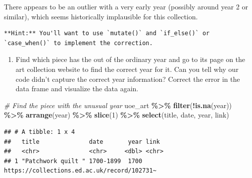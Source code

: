 \documentclass[
]{article}
\newenvironment{Shaded}{\begin{snugshade}}{\end{snugshade}}
\newcommand{\CommentTok}[1]{\textcolor[rgb]{0.56,0.35,0.01}{\textit{#1}}}
\newcommand{\DecValTok}[1]{\textcolor[rgb]{0.00,0.00,0.81}{#1}}
\newcommand{\FunctionTok}[1]{\textcolor[rgb]{0.13,0.29,0.53}{\textbf{#1}}}
\newcommand{\NormalTok}[1]{#1}
\newcommand{\SpecialCharTok}[1]{\textcolor[rgb]{0.81,0.36,0.00}{\textbf{#1}}}
\providecommand{\tightlist}{%
  \setlength{\itemsep}{0pt}\setlength{\parskip}{0pt}}
\begin{document}
There appears to be an outlier with a very early year (possibly around
year 2 or similar), which seems historically implausible for this
collection.

\begin{verbatim}
**Hint:** You'll want to use `mutate()` and `if_else()` or `case_when()` to implement the correction.
\end{verbatim}

\begin{enumerate}
\def\labelenumi{\arabic{enumi}.}
\setcounter{enumi}{11}
\tightlist
\item
  Find which piece has the out of the ordinary year and go to its page
  on the art collection website to find the correct year for it. Can you
  tell why our code didn't capture the correct year information? Correct
  the error in the data frame and visualize the data again.
\end{enumerate}

\begin{Shaded}
\begin{Highlighting}[]
\CommentTok{\# Find the piece with the unusual year}
\NormalTok{uoe\_art }\SpecialCharTok{\%\textgreater{}\%}
  \FunctionTok{filter}\NormalTok{(}\SpecialCharTok{!}\FunctionTok{is.na}\NormalTok{(year)) }\SpecialCharTok{\%\textgreater{}\%}
  \FunctionTok{arrange}\NormalTok{(year) }\SpecialCharTok{\%\textgreater{}\%}
  \FunctionTok{slice}\NormalTok{(}\DecValTok{1}\NormalTok{) }\SpecialCharTok{\%\textgreater{}\%}
  \FunctionTok{select}\NormalTok{(title, date, year, link)}
\end{Highlighting}
\end{Shaded}

\begin{verbatim}
## # A tibble: 1 x 4
##   title              date       year link                                       
##   <chr>              <chr>     <dbl> <chr>                                      
## 1 "Patchwork quilt " 1700-1899  1700 https://collections.ed.ac.uk/record/102731~
\end{verbatim}
\end{document}
